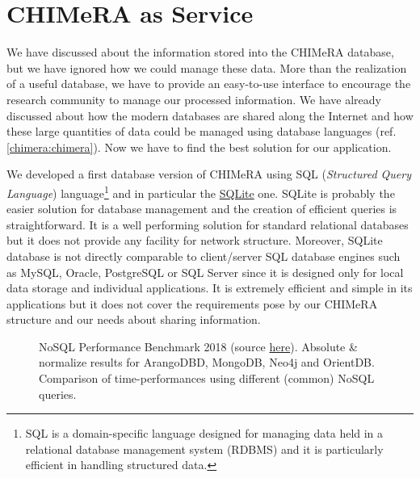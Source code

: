\documentclass{standalone}
\begin{document}
\section[CHIMeRA as Service]{CHIMeRA as Service}\label{chimera:caas}

We have discussed about the information stored into the \textsf{CHIMeRA} database, but we have ignored how we could manage these data.
More than the realization of a useful database, we have to provide an easy-to-use interface to encourage the research community to manage our processed information.
We have already discussed about how the modern databases are shared along the Internet and how these large quantities of data could be managed using database languages (ref. \ref{chimera:chimera}).
Now we have to find the best solution for our application.

We developed a first database version of \textsf{CHIMeRA} using \textsf{SQL} (\emph{Structured Query Language}) language\footnote{
  \textsf{SQL} is a domain-specific language designed for managing data held in a relational database management system (RDBMS) and it is particularly efficient in handling structured data.

} and in particular the \href{https://www.sqlite.org/index.html}{\textsf{SQLite}} one.
\textsf{SQLite} is probably the easier solution for database management and the creation of efficient queries is straightforward.
It is a well performing solution for standard relational databases but it does not provide any facility for network structure.
Moreover, \textsf{SQLite} database is not directly comparable to client/server \textsf{SQL} database engines such as \textsf{MySQL}, \textsf{Oracle}, \textsf{PostgreSQL} or \textsf{SQL Server} since it is designed only for local data storage and individual applications.
It is extremely efficient and simple in its applications but it does not cover the requirements pose by our \textsf{CHIMeRA} structure and our needs about sharing information.

\begin{figure}[htbp]
\centering
\def\svgwidth{0.5\textwidth}

\caption{\textsf{NoSQL} Performance Benchmark 2018 (source \href{https://www.arangodb.com/2018/02/nosql-performance-benchmark-2018-mongodb-postgresql-orientdb-neo4j-arangodb/}{here}).
Absolute \& normalize results for ArangoDBD, MongoDB, Neo4j and OrientDB.
Comparison of time-performances using different (common) \textsf{NoSQL} queries.
}
\label{fig:arango}
\end{figure}
\end{document}
